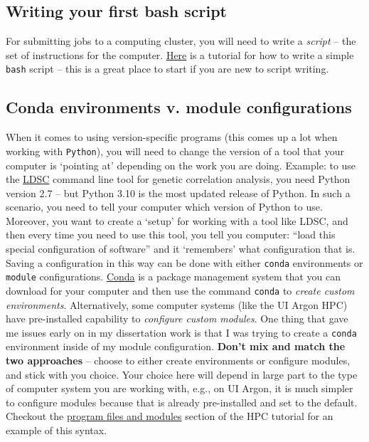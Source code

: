 \documentclass[
]{book}
\begin{document}
\hypertarget{writing-your-first-bash-script}{%
\subsection{Writing your first bash script}\label{writing-your-first-bash-script}}

For submitting jobs to a computing cluster, you will need to write a \emph{script} -- the set of instructions for the computer. \href{https://www.linuxfoundation.org/blog/blog/classic-sysadmin-writing-a-simple-bash-script}{Here} is a tutorial for how to write a simple \texttt{bash} script -- this is a great place to start if you are new to script writing.

\hypertarget{conda-environments-v.-module-configurations}{%
\subsection{Conda environments v. module configurations}\label{conda-environments-v.-module-configurations}}

When it comes to using version-specific programs (this comes up a lot when working with \texttt{Python}), you will need to change the version of a tool that your computer is `pointing at' depending on the work you are doing. Example: to use the \href{https://github.com/bulik/ldsc/wiki/Heritability-and-Genetic-Correlation}{LDSC} command line tool for genetic correlation analysis, you need Python version 2.7 -- but Python 3.10 is the most updated release of Python. In such a scenario, you need to tell your computer which version of Python to use. Moreover, you want to create a `setup' for working with a tool like LDSC, and then every time you need to use this tool, you tell you computer: ``load this special configuration of software'' and it `remembers' what configuration that is. Saving a configuration in this way can be done with either \texttt{conda} environments or \texttt{module} configurations. \href{https://docs.conda.io/en/latest/}{Conda} is a package management system that you can download for your computer and then use the command \texttt{conda} to \emph{create custom environments}. Alternatively, some computer systems (like the UI Argon HPC) have pre-installed capability to \emph{configure custom modules}. One thing that gave me issues early on in my dissertation work is that I was trying to create a \texttt{conda} environment inside of my module configuration. \textbf{Don't mix and match the two approaches} -- choose to either create environments or configure modules, and stick with you choice. Your choice here will depend in large part to the type of computer system you are working with, e.g., on UI Argon, it is much simpler to configure modules because that is already pre-installed and set to the default. Checkout the \href{https://iowabiostat.github.io/hpc/3.html}{program files and modules} section of the HPC tutorial for an example of this syntax.
\end{document}
